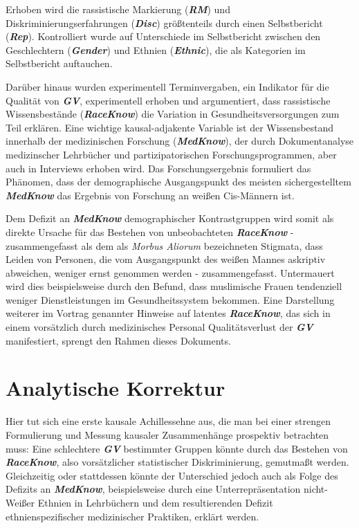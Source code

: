 \documentclass[
  11pt,
  oneside]{article}
\begin{document}
Erhoben wird die rassistische Markierung (\textbf{\emph{RM}}) und
Diskriminierungserfahrungen (\textbf{\emph{Disc}}) größtenteils durch
einen Selbstbericht (\textbf{\emph{Rep}}). Kontrolliert wurde auf
Unterschiede im Selbstbericht zwischen den Geschlechtern
(\textbf{\emph{Gender}}) und Ethnien (\textbf{\emph{Ethnic}}), die als
Kategorien im Selbstbericht auftauchen.

Darüber hinaus wurden experimentell Terminvergaben, ein Indikator für
die Qualität von \textbf{\emph{GV}}, experimentell erhoben und
argumentiert, dass rassistische Wissensbestände
(\textbf{\emph{RaceKnow}}) die Variation in Gesundheitsversorgungen zum
Teil erklären. Eine wichtige kausal-adjakente Variable ist der
Wissensbestand innerhalb der medizinischen Forschung
(\textbf{\emph{MedKnow}}), der durch Dokumentanalyse medizinscher
Lehrbücher und partizipatorischen Forschungsprogrammen, aber auch in
Interviews erhoben wird. Das Forschungsergebnis formuliert das Phänomen,
dass der demographische Ausgangspunkt des meisten sichergestelltem
\textbf{\emph{MedKnow}} das Ergebnis von Forschung an weißen Cis-Männern
ist.

Dem Defizit an \textbf{\emph{MedKnow}} demographischer Kontrastgruppen
wird somit als direkte Ursache für das Bestehen von unbeobachteten
\textbf{\emph{RaceKnow}} - zusammengefasst als dem als \emph{Morbus
Aliorum} bezeichneten Stigmata, dass Leiden von Personen, die vom
Ausgangspunkt des weißen Mannes askriptiv abweichen, weniger ernst
genommen werden - zusammengefasst. Untermauert wird dies beispielsweise
durch den Befund, dass muslimische Frauen tendenziell weniger
Dienstleistungen im Gesundheitssystem bekommen. Eine Darstellung
weiterer im Vortrag genannter Hinweise auf latentes
\textbf{\emph{RaceKnow}}, das sich in einem vorsätzlich durch
medizinisches Personal Qualitätsverlust der \textbf{\emph{GV}}
manifestiert, sprengt den Rahmen dieses Dokuments.

\hypertarget{analytische-korrektur}{%
\section{Analytische Korrektur}\label{analytische-korrektur}}

Hier tut sich eine erste kausale Achillessehne aus, die man bei einer
strengen Formulierung und Messung kausaler Zusammenhänge prospektiv
betrachten muss: Eine schlechtere \textbf{\emph{GV}} bestimmter Gruppen
könnte durch das Bestehen von \textbf{\emph{RaceKnow}}, also
vorsätzlicher statistischer Diskriminierung, gemutmaßt werden.
Gleichzeitig oder stattdessen könnte der Unterschied jedoch auch als
Folge des Defizits an \textbf{\emph{MedKnow}}, beispielsweise durch eine
Unterrepräsentation nicht-Weißer Ethnien in Lehrbüchern und dem
resultierenden Defizit ethnienspezifischer medizinischer Praktiken,
erklärt werden.
\end{document}
